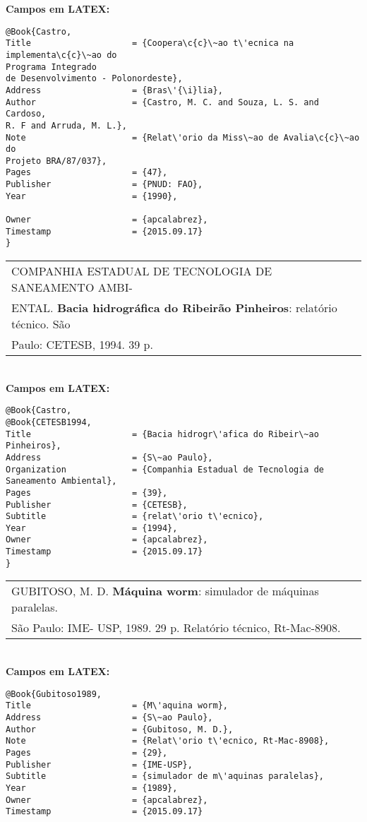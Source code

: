 \textbf{Campos em LATEX:}

\begin{verbatim}
@Book{Castro,
Title                    = {Coopera\c{c}\~ao t\'ecnica na implementa\c{c}\~ao do 
Programa Integrado 
de Desenvolvimento - Polonordeste},
Address                  = {Bras\'{\i}lia},
Author                   = {Castro, M. C. and Souza, L. S. and Cardoso, 
R. F and Arruda, M. L.},
Note                     = {Relat\'orio da Miss\~ao de Avalia\c{c}\~ao do 
Projeto BRA/87/037},
Pages                    = {47},
Publisher                = {PNUD: FAO},
Year                     = {1990},

Owner                    = {apcalabrez},
Timestamp                = {2015.09.17}
}
\end{verbatim}

\begin{tabular}{|l|c|} \hline
	COMPANHIA ESTADUAL DE TECNOLOGIA DE SANEAMENTO AMBI-\\ENTAL. \textbf{Bacia hidrogr\'afica do Ribeir\~ao Pinheiros}: relat\'orio t\'ecnico. S\~ao \\Paulo: CETESB, 1994. 39 p.   \\\hline
\end{tabular}\\

\textbf{Campos em LATEX:}

\begin{verbatim}
@Book{Castro,
@Book{CETESB1994,
Title                    = {Bacia hidrogr\'afica do Ribeir\~ao Pinheiros},
Address                  = {S\~ao Paulo},
Organization             = {Companhia Estadual de Tecnologia de 
Saneamento Ambiental},
Pages                    = {39},
Publisher                = {CETESB},
Subtitle                 = {relat\'orio t\'ecnico},
Year                     = {1994},
Owner                    = {apcalabrez},
Timestamp                = {2015.09.17}
}
\end{verbatim}

\begin{tabular}{|l|c|} \hline
	GUBITOSO, M. D. \textbf{M\'aquina worm}: simulador de m\'aquinas paralelas. \\S\~ao Paulo: IME- USP, 1989. 29 p. Relat\'orio t\'ecnico, Rt-Mac-8908.   \\\hline
\end{tabular}\\

\textbf{Campos em LATEX:}

\begin{verbatim}
@Book{Gubitoso1989,
Title                    = {M\'aquina worm},
Address                  = {S\~ao Paulo},
Author                   = {Gubitoso, M. D.},
Note                     = {Relat\'orio t\'ecnico, Rt-Mac-8908},
Pages                    = {29},
Publisher                = {IME-USP},
Subtitle                 = {simulador de m\'aquinas paralelas},
Year                     = {1989},
Owner                    = {apcalabrez},
Timestamp                = {2015.09.17}
\end{verbatim}


